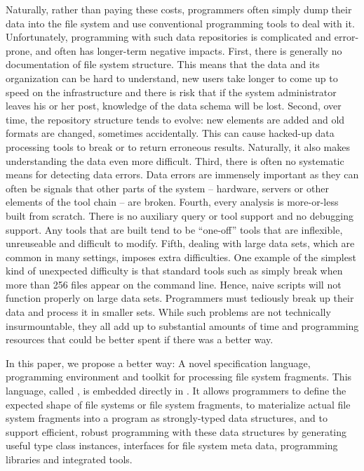 Naturally, rather than paying these costs, programmers often simply
dump their data into the file system and use conventional programming
tools to deal with it.  Unfortunately, programming with such data 
repositories is complicated and error-prone, and often has longer-term
negative impacts.  First, there is generally no documentation
of file system structure.  This means that the data and its organization
can be hard to understand,
new users take longer to come up to speed on the infrastructure and there
is risk that if the system administrator leaves his or her post, knowledge
of the data schema will be lost.  Second, over time, the repository
structure tends to evolve: new elements are added and old formats are changed,
sometimes accidentally.  This can cause hacked-up data processing
tools to break or to return erroneous results. Naturally, it also makes
understanding the data even more difficult.  Third, there is often no 
systematic means for detecting data errors.  Data errors are immensely
important as they can often be signals that other parts of the system --
hardware, servers or other elements of the tool chain -- are broken.
Fourth, every analysis is more-or-less
built from scratch.  There is no auxiliary 
query or tool support and no debugging support.  Any tools that are
built tend to be ``one-off'' tools that are inflexible, unreuseable
and difficult to modify.  Fifth, dealing with large data sets, which
are common in many settings, imposes extra difficulties.  One example
of the simplest kind of unexpected difficulty is that standard tools 
such as  simply break when more than 256 files appear on the
command line.  Hence, naive scripts will not function properly on
large data sets.  Programmers must tediously break up their data
and process it in smaller sets.  While such problems are not
technically insurmountable, they all add up to substantial amounts
of time and programming resources that could be better spent if there
was a better way.

In this paper, we propose a better way:  A novel specification language,
programming environment and toolkit for processing file system fragments.
This language, called \forest{}, is embedded directly in \haskell{}.
%
It allows programmers to define the expected shape of file systems or
file system fragments, to materialize actual file system fragments
into a \haskell{} program as strongly-typed 
\haskell{} data structures, and to support efficient, robust 
programming with these
data structures by generating useful type class instances, interfaces for
file system meta data, programming libraries
and integrated tools.  

